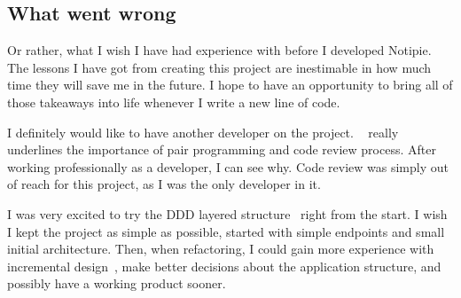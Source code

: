 \subsection{What went wrong}\label{sec:what-went-wrong}

Or rather,
what I wish I have had experience with
before I developed Notipie.
The lessons I have got from creating this project
are inestimable in how much time they will save me
in the future.
I hope to have an opportunity to
bring all of those takeaways into life
whenever I write a new line of code.

I definitely would like to have another developer
on the project.
~\cite{beck_extreme_2004}
really underlines the importance of pair programming
and code review process.
After working professionally as a developer,
I can see why.
Code review was simply out of reach for this project,
as I was the only developer in it.

I was very excited to try the
\ac{DDD} layered structure~\cite{evans_domain-driven_2003}
right from the start.
I wish I kept the project as simple as possible,
started with simple endpoints
and small initial architecture.
Then, when refactoring,
I could gain more experience
with incremental design~\cite{fowler_refactoring_2019,beck_extreme_2004},
make better decisions about the application structure,
and possibly have a working product sooner.
